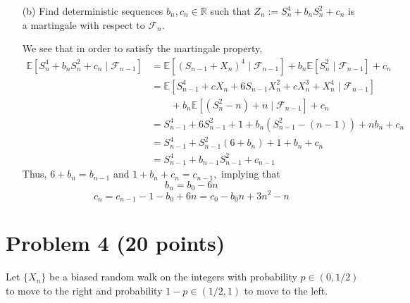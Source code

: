 \documentclass[11pt]{article}
\newcommand{\bbE}{\mathbb{E}}
\begin{document}
\begin{itemize}
\begin{solution}
    \end{solution}
    \item[(b)] Find deterministic sequences \(b_n, c_n \in \mathbb{R}\) such that \(Z_n := S_n^4 + b_n S_n^2 + c_n\) is a martingale with respect to \(\mathcal{F}_n\).
\begin{solution}
We see that in order to satisfy the martingale property, 
\begin{align*}
    \bbE[S_n^4 + b_n S_n^2 + c_n \mid\mathcal{F}_{n-1}]
    &= \bbE[(S_{n-1} + X_n)^4 \mid \mathcal{F}_{n-1}] + b_n\bbE[S_n^2 \mid\mathcal{F}_{n-1}] + c_n\\
    &= \bbE[S_{n-1}^4 + cX_n + 6S_{n-1}X_n^2 + cX_n^3 + X_n^4 \mid \mathcal{F}_{n-1}] \\&\qquad+ b_n\bbE[(S_n^2 - n)+ n \mid\mathcal{F}_{n-1}] + c_n\\
    &= S_{n-1}^4 + 6S_{n-1}^2 + 1+ b_n(S_{n-1}^2 - (n-1)) + nb_n + c_n\\
    &= S_{n-1}^4 + S_{n-1}^2(6 + b_n) + 1+ b_n + c_n\\
    &= S^4_{n-1} + b_{n-1}S^2_{n-1} + c_{n-1}
\end{align*}
Thus, $6 + b_n = b_{n-1}$ and $1 + b_n + c_n = c_{n-1},$ implying that 
\[b_n = b_0 - 6n\]
\[c_n = c_{n-1} - 1 - b_0 + 6n = c_0 - b_0n  + 3n^2 - n\]
\end{solution}
\end{itemize}

\newpage

\section*{Problem 4 (20 points)}
Let \(\{X_n\}\) be a biased random walk on the integers with probability \(p \in (0, 1/2)\) to move to the right and probability \(1 - p \in (1/2, 1)\) to move to the left.
\end{document}
